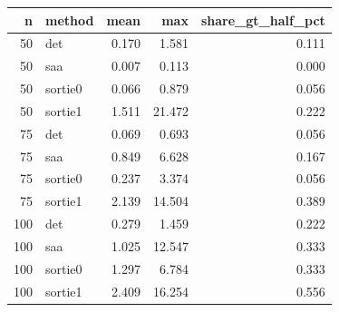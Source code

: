 \begin{tabular}{rlrrr}
\toprule
n & method & mean & max & share_gt_half_pct \\
\midrule
50 & det & 0.170 & 1.581 & 0.111 \\
50 & saa & 0.007 & 0.113 & 0.000 \\
50 & sortie0 & 0.066 & 0.879 & 0.056 \\
50 & sortie1 & 1.511 & 21.472 & 0.222 \\
75 & det & 0.069 & 0.693 & 0.056 \\
75 & saa & 0.849 & 6.628 & 0.167 \\
75 & sortie0 & 0.237 & 3.374 & 0.056 \\
75 & sortie1 & 2.139 & 14.504 & 0.389 \\
100 & det & 0.279 & 1.459 & 0.222 \\
100 & saa & 1.025 & 12.547 & 0.333 \\
100 & sortie0 & 1.297 & 6.784 & 0.333 \\
100 & sortie1 & 2.409 & 16.254 & 0.556 \\
\bottomrule
\end{tabular}

